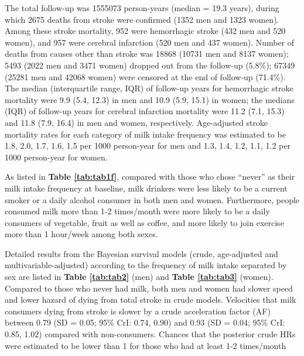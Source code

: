 \documentclass[nutrients,article,submitted,moreauthors,pdftex]{Definitions/mdpi}
\begin{document}
The total follow-up was 1555073 person-years (median = 19.3 years),
during which 2675 deaths from stroke were confirmed (1352 men and 1323
women). Among these stroke mortality, 952 were hemorrhagic stroke (432
men and 520 women), and 957 were cerebral infarction (520 men and 437
women). Number of deaths from causes other than stroke was 18868 (10731
men and 8137 women); 5493 (2022 men and 3471 women) dropped out from the
follow-up (5.8\%); 67349 (25281 men and 42068 women) were censored at
the end of follow-up (71.4\%). The median (interquartile range, IQR) of
follow-up years for hemorrhagic stroke mortality were 9.9 (5.4, 12.3) in
men and 10.9 (5.9, 15.1) in women; the medians (IQR) of follow-up years
for cerebral infarction mortality were 11.2 (7.1, 15.3) and 11.8 (7.9,
16.4) in men and women, respectively. Age-adjusted stroke mortality
rates for each category of milk intake frequency was estimated to be
1.8, 2.0, 1.7, 1.6, 1.5 per 1000 person-year for men and 1.3, 1.4, 1.2,
1.1, 1.2 per 1000 person-year for women.

As listed in \textbf{Table \ref{tab:tab1f}}, compared with those who
chose ``never'' as their milk intake frequency at baseline, milk
drinkers were less likely to be a current smoker or a daily alcohol
consumer in both men and women. Furthermore, people consumed milk more
than 1-2 times/month were more likely to be a daily consumers of
vegetable, fruit as well as coffee, and more likely to join exercise
more than 1 hour/week among both sexes.

Detailed results from the Bayesian survival models (crude, age-adjusted
and multivariable-adjusted) according to the frequency of milk intake
separated by sex are listed in \textbf{Table \ref{tab:tab2}} (men) and
\textbf{Table \ref{tab:tab3}} (women). Compared to those who never had
milk, both men and women had slower speed and lower hazard of dying from
total stroke in crude models. Velocities that milk consumers dying from
stroke is slower by a crude acceleration factor (AF) between 0.79 (SD =
0.05; 95\% CrI: 0.74, 0.90) and 0.93 (SD = 0.04; 95\% CrI: 0.85, 1.02)
compared with non-consumers. Chances that the posterior crude HRs were
estimated to be lower than 1 for those who had at least 1-2 times/month
\end{document}
